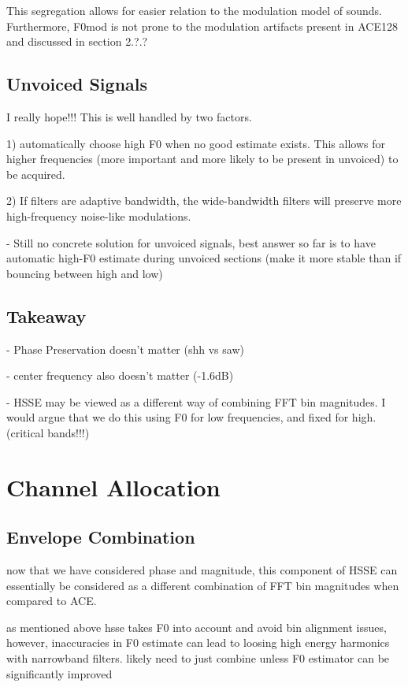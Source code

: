 \documentclass [11pt, proquest] {uwthesis}[2015/03/03]
\begin{document}
This segregation allows for easier relation to the modulation model of sounds.  Furthermore, F0mod is not prone to the modulation artifacts present in ACE128 and discussed in section 2.?.?


\subsection{Unvoiced Signals}

I really hope!!!  This is well handled by two factors.

1) automatically choose high F0 when no good estimate exists.  This allows for higher frequencies (more important and more likely to be present in unvoiced) to be acquired.

2) If filters are adaptive bandwidth, the wide-bandwidth filters will preserve more high-frequency noise-like modulations.


 - Still no concrete solution for unvoiced signals, best answer so far is to have automatic high-F0 estimate during unvoiced sections (make it more stable than if bouncing between high and low)

\subsection{Takeaway}

 - Phase Preservation doesn't matter (shh vs saw)
 
 - center frequency also doesn't matter (-1.6dB)
 
 - HSSE may be viewed as a different way of combining FFT bin magnitudes.  I would argue that we do this using F0 for low frequencies, and fixed for high.  (critical bands!!!)

\section{Channel Allocation}

\subsection{Envelope Combination}

now that we have considered phase and magnitude, this component of HSSE can essentially be considered as a different combination of FFT bin magnitudes when compared to ACE.

as mentioned above hsse takes F0 into account and avoid bin alignment issues, however, inaccuracies in F0 estimate can lead to loosing high energy harmonics with narrowband filters.  likely need to just combine unless F0 estimator can be significantly improved
\end{document}
